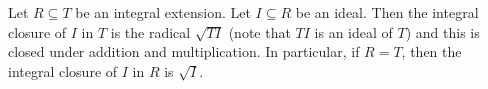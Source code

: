 Let $R \subseteq T$ be an integral extension. Let $I \subseteq R$ be an ideal.
Then the integral closure of $I$ in $T$ is the radical $\sqrt{TI}$
(note that $TI$ is an ideal of $T$) and this is closed under addition and
multiplication. In particular, if $R = T$, then the integral closure of
$I$ in $R$ is $\sqrt{I}$.
